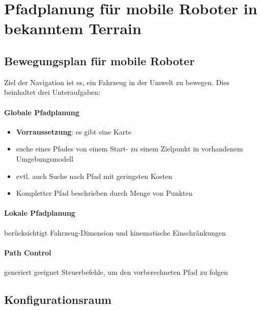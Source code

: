 \section{Pfadplanung für mobile Roboter in bekanntem Terrain}
\subsection{Bewegungsplan für mobile Roboter}
Ziel der Navigation ist es, ein Fahrzeug in der Umwelt zu bewegen.
Dies beinhaltet drei Unteraufgaben:
\paragraph{Globale Pfadplanung}
\begin{itemize}
	\item \textbf{Vorraussetzung}: es gibt eine Karte
	\item suche eines Pfades von einem Start- zu einem Zielpunkt in vorhandenem Umgebungsmodell
	\item evtl. auch Suche nach Pfad mit geringsten Kosten
	\item Kompletter Pfad beschrieben durch Menge von Punkten
\end{itemize}
\paragraph{Lokale Pfadplanung} berücksichtigt Fahrzeug-Dimension und kinematische Einschränkungen
\paragraph{Path Control} generiert geeignet Steuerbefehle, um den vorberechneten Pfad zu folgen
\subsection{Konfigurationsraum}
